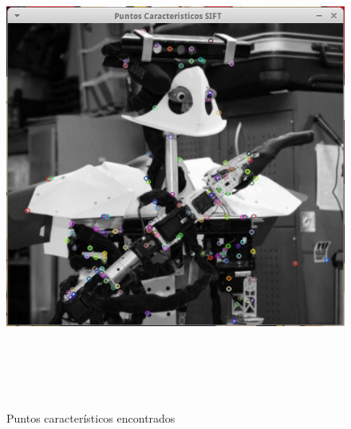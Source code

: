 \begin{figure}[H]
			\centering
				\includegraphics[height=16cm]{img/KeyPoints.png}
			\caption{Puntos característicos encontrados}
\end{figure}
